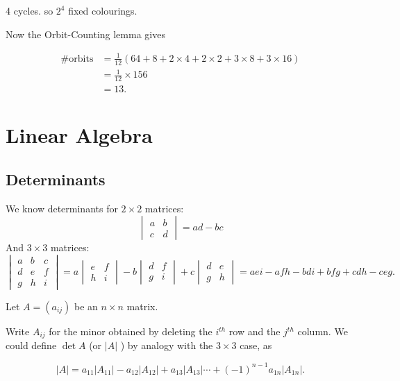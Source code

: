 \documentclass{article}
\theoremstyle{definition} \newtheorem*{definition}{Definition}
\begin{document}
\begin{exmps}
\begin{itemize}
\begin{figure}[h]
         \label{fig:necklace1} \end{figure}
       

       4 cycles. so $2^4$ fixed colourings.

       
       Now the Orbit-Counting lemma gives

       \begin{align*} \# \text{orbits} &= \frac{1}{12}(64 + 8 + 2\times4 +
         2\times 2 + 3 \times 8 + 3 \times 16)\\ &= \frac{1}{12}\times 156 \\
         &= 13.  \end{align*} \end{itemize} \end{exmps}

\section{Linear Algebra} \subsection{Determinants} We know determinants for $2
\times 2$ matrices: \[ \begin{vmatrix} a & b \\ c & d \end{vmatrix} = ad - bc
\] And $3 \times 3$ matrices: \[ \begin{vmatrix} a & b & c \\ d & e & f \\ g &
    h & i \end{vmatrix} = a \begin{vmatrix} e & f \\ h & i \end{vmatrix} -
b\begin{vmatrix} d & f \\ g & i \end{vmatrix} + c\begin{vmatrix} d & e \\ g & h
\end{vmatrix} = aei - afh - bdi +bfg +cdh-ceg.  \]

Let $A=(a_{ij})$  be an $n \times n$ matrix.

Write $A_{ij}$ for the minor obtained by deleting the $i^{th}$ row and the
$j^{th}$ column. We could define $\det A$ (or $|A|$ ) by analogy with the $3
\times 3$ case, as

\[ |A| = a_{11}|A_{11}| - a_{12}|A_{12}| + a_{13}|A_{13}| \cdots +
(-1)^{n-1}a_{1n}|A_{1n}|.  \]
\end{document}
